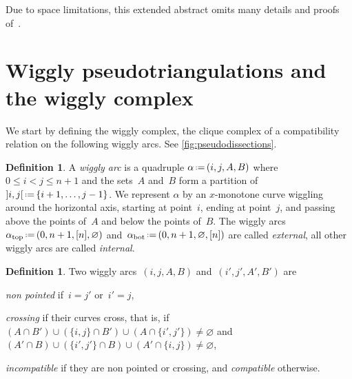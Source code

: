 \documentclass[submission]{FPSAC2025}
\theoremstyle{definition}
\newtheorem{definition}[theorem]{Definition}
\newcommand{\eqdef}{\mbox{\,\raisebox{0.2ex}{\scriptsize\ensuremath{\mathrm:}}\ensuremath{=}\,}} %
\newcommand{\darkblue}{\color{darkblue}} %
\newcommand{\defn}[1]{\textsl{\darkblue #1}} %
\begin{document}
Due to space limitations, this extended abstract omits many details and proofs of~\cite{BapatPilaud}.

\newpage
\section{Wiggly pseudotriangulations and the wiggly complex}
\label{sec:wigglyPseudotriangulations}

We start by defining the wiggly complex, the clique complex of a compatibility relation on the following wiggly arcs.
See \cref{fig:pseudodissections}.

\begin{definition}
A \defn{wiggly arc} is a quadruple $\alpha \eqdef (i,j,A,B)$ where $0 \!\le\! i \!<\! j \!\le\! n+1$ and the sets~$A$ and~$B$ form a partition of~${]i,j[} \eqdef \{i+1, \dots, j-1\}$.
We represent $\alpha$ by an $x$-monotone curve wiggling around the horizontal axis, starting at point~$i$, ending at point~$j$, and passing above the points of~$A$ and below the points of~$B$.
The wiggly arcs~$\alpha_\mathrm{top} \eqdef (0, n+1, [n], \varnothing)$ and~$\alpha_\mathrm{bot} \eqdef (0, n+1, \varnothing, [n])$ are called \defn{external}, all other wiggly arcs are called \defn{internal}.
\end{definition}

\begin{definition}
\label{def:compatible}
Two wiggly arcs~$(i,j,A,B)$ and~$(i',j',A',B')$ are 
\begin{compactitem}
\item \defn{non pointed} if~$i = j'$ or~$i' = j$,
\item \defn{crossing} if their curves cross, that is, if $(A \cap B') \cup (\{i,j\} \cap B') \cup (A \cap \{i',j'\}) \ne \varnothing$ and $(A' \cap B) \cup (\{i',j'\} \cap B) \cup (A' \cap \{i,j\})\ne \varnothing$,
\item \defn{incompatible} if they are non pointed or crossing, and \defn{compatible} otherwise.
\end{compactitem}
%
\end{definition}
\end{document}
